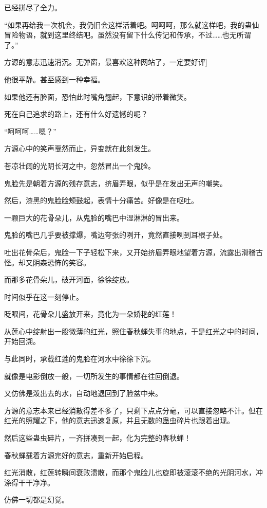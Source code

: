 \begin{this_body}
已经拼尽了全力。

“如果再给我一次机会，我仍旧会这样活着吧。呵呵呵，那么就这样吧，我的蛊仙冒险物语，就到这里终结吧。虽然没有留下什么传记和传承，不过……也无所谓了。”

方源的意志迅速消沉。无弹窗，最喜欢这种网站了，一定要好评]

他很平静。甚至感到一种幸福。

如果他还有脸面，恐怕此时嘴角翘起，下意识的带着微笑。

死在自己追求的路上，还有什么好遗憾的呢？

“呵呵呵……嗯？”

方源心中的笑声戛然而止，异变就在此刻发生。

苍凉壮阔的光阴长河之中，忽然冒出一个鬼脸。

鬼脸先是朝着方源的残存意志，挤眉弄眼，似乎是在发出无声的嘲笑。

然后，漆黑的鬼脸脸颊鼓起，表情十分痛苦。好像是在呕吐。

一颗巨大的花骨朵儿，从鬼脸的嘴巴中湿淋淋的冒出来。

鬼脸的嘴巴几乎要被撑爆，嘴边夸张的咧开，竟然直接咧到耳根子处。

吐出花骨朵后，鬼脸一下子轻松下来，又开始挤眉弄眼地望着方源，流露出滑稽古怪。却又阴森恐怖的笑容。

而那多花骨朵儿，破开河面，徐徐绽放。

时间似乎在这一刻停止。

眨眼间，花骨朵儿盛放开来，竟化为一朵娇艳的红莲！

从莲心中绽射出一股微薄的红光，照住春秋蝉失事的地点，于是红光之中的时间，开始回溯。

与此同时，承载红莲的鬼脸在河水中徐徐下沉。

就像是电影倒放一般，一切所发生的事情都在往回倒退。

又仿佛是泼出去的水，自动地退回到了脸盆中来。

方源的意志本来已经消散得差不多了，只剩下点点分毫，可以直接忽略不计。但在红光的照耀之下，他的意志迅速复原，并且无数的蛊虫碎片也跟着出现。

然后这些蛊虫碎片，一齐拼凑到一起，化为完整的春秋蝉！

春秋蝉载着方源完好的意志，重新开始启程。

红光消散，红莲转瞬间衰败溃散，而那个鬼脸儿也旋即被滚滚不绝的光阴河水，冲涤得干干净净。

仿佛一切都是幻觉。


\end{this_body}
